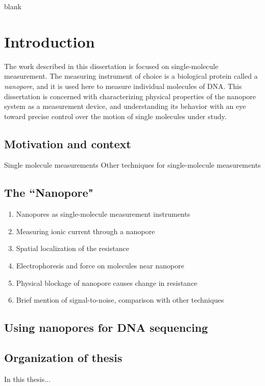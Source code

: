 \begin{savequote}[75mm]
blank
\end{savequote}

\chapter{Introduction}
\label{introduction}

The work described in this dissertation is focused on single-molecule measurement.  The measuring instrument of choice is a biological protein called a \textit{nanopore}, and it is used here to measure individual molecules of DNA.  This dissertation is concerned with characterizing physical properties of the nanopore system as a measurement device, and understanding its behavior with an eye toward precise control over the motion of single molecules under study.

\section{Motivation and context}


Single molecule measurements
Other techniques for single-molecule measurements

\section{The ``Nanopore"}

\begin{enumerate}
\item Nanopores as single-molecule measurement instruments
\item Measuring ionic current through a nanopore
\item Spatial localization of the resistance
\item Electrophoresis and force on molecules near nanopore
\item Physical blockage of nanopore causes change in resistance
\item Brief mention of signal-to-noise, comparison with other techniques
\end{enumerate}

\section{Using nanopores for DNA sequencing}



\section{Organization of thesis}

In this thesis... \cite{Bryant1994} \cite{Vercoutere2001}
